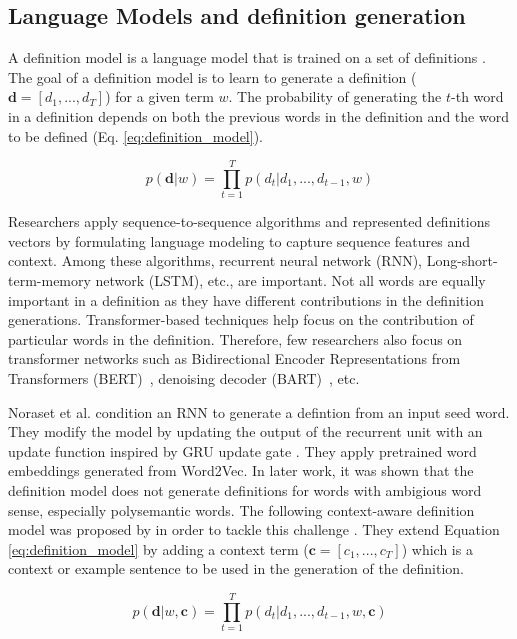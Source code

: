 \subsection{Language Models and definition generation}
A definition model is a language model that is trained on a set of definitions
\cite{noraset_definition_2016}. The goal of a definition model is to learn to
generate a definition ($\textbf{d} = [d_1, ..., d_T]$) for a given term $w$. The
probability of generating the $t$-th word in a definition depends on both the
previous words in the definition and the word to be defined (Eq.
\ref{eq:definition_model}).

\begin{equation}
    \label{eq:definition_model}
    p(\textbf{d} | w) = \prod_{t=1}^{T} p(d_t | d_1,...,d_{t-1}, w)
\end{equation}

Researchers apply sequence-to-sequence algorithms and represented definitions vectors by formulating language modeling to capture sequence features and context. Among these algorithms, recurrent neural network (RNN), Long-short-term-memory network (LSTM), etc., are important. Not all words are equally important in a definition as they have different contributions in the definition generations. Transformer-based techniques help focus on the contribution of particular words in the definition. Therefore, few researchers also focus on transformer networks such as Bidirectional Encoder Representations from Transformers (BERT)~\citeauthor*{devlin2018bert}, denoising decoder (BART)~\citeauthor*{lewis2019bart}, etc.

Noraset et al. condition an RNN to generate a defintion from an input seed word.
They modify the model by updating the output of the recurrent unit with an
update function inspired by GRU update gate \cite{noraset_definition_2016}. They
apply pretrained word embeddings generated from Word2Vec. In later work, it was shown that the definition model does not generate
definitions for words with ambigious word sense, especially polysemantic words.
The following context-aware definition model was proposed by
\citeauthor*{gadetsky_conditional_2018} in order to tackle this challenge
\cite{gadetsky_conditional_2018}. They extend Equation \ref{eq:definition_model}
by adding a context term ($\textbf{c} = [c_1, ..., c_T]$) which is a context or
example sentence to be used in the generation of the definition.

\begin{equation}
    \label{eq:context_aware_definition_model}
    p(\textbf{d} | w, \textbf{c}) = \prod_{t=1}^{T} p(d_t | d_1,...,d_{t-1}, w, \textbf{c})
\end{equation}

